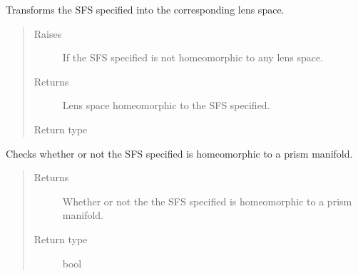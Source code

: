 \documentclass[letterpaper,10pt,english]{sphinxmanual}
\begin{document}
\begin{fulllineitems}

\begin{fulllineitems}
\label{\detokenize{soapy:soapy.SFS.to_lens_space}}
\sphinxAtStartPar
Transforms the SFS specified into the corresponding lens space.
\begin{quote}\begin{description}
\item[{Raises}] \leavevmode
\sphinxAtStartPar
{} \textendash{} If the SFS specified is not homeomorphic to any lens space.

\item[{Returns}] \leavevmode
\sphinxAtStartPar
Lens space homeomorphic to the SFS specified.

\item[{Return type}] \leavevmode
\sphinxAtStartPar
{\hyperref[\detokenize{soapy:soapy.Lens}]{}}

\end{description}\end{quote}

\end{fulllineitems}


\begin{fulllineitems}
\label{\detokenize{soapy:soapy.SFS.is_prism_mfld}}
\sphinxAtStartPar
Checks whether or not the SFS specified is homeomorphic to a prism manifold.
\begin{quote}\begin{description}
\item[{Returns}] \leavevmode
\sphinxAtStartPar
Whether or not the the SFS specified is homeomorphic to a prism manifold.

\item[{Return type}] \leavevmode
\sphinxAtStartPar
bool

\end{description}\end{quote}

\end{fulllineitems}



\end{fulllineitems}
\end{document}
